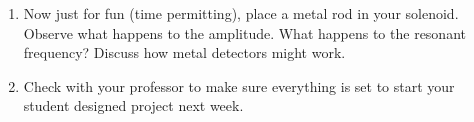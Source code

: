\begin{enumerate}
\begin{enumerate}
		\item Adjust your signal generator near your new natural frequency of oscillation. Note what happens to the amplitude as you tune the dial. This should be the same as what you saw on the Oscilloscope (I might suggest just leaving the oscilloscope connected).

		\item Once again, determine your actual resonant frequency, $f_{A}$.

		\item Once again, calculate your inductance based on $f_{A}$. Compare to your calculated value. If there is a difference, try to explain it.
	\end{enumerate}

	\item Now just for fun (time permitting), place a metal rod in your solenoid. Observe what happens to the amplitude. What happens to the resonant frequency? Discuss how metal detectors might work.

	\item Check with your professor to make sure everything is set to start your student designed project next week.
\end{enumerate}


\vfill

